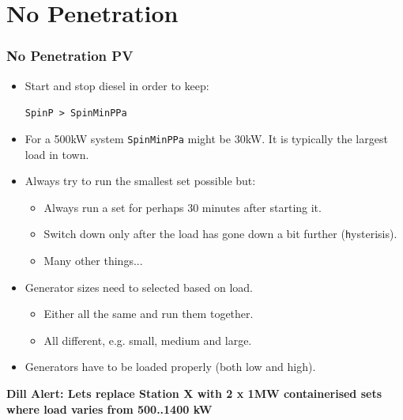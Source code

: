 \documentclass[a4paper,handout]{beamer}
\def\dill#1{\textcolor{RawSienna}{\textbf{Dill Alert: #1}}}
\begin{document}
\section{No Penetration}
\begin{frame}\frametitle{No Penetration PV}
  \begin{itemize}
  \item Start and stop diesel in order to keep:
    
    \texttt{SpinP > SpinMinPPa}
  \item For a 500kW system \texttt{SpinMinPPa} might
    be 30kW. It is typically the largest load in town.  \pause
  \item Always try to run the smallest set possible but:
    \begin{itemize}
    \item Always run a set for perhaps 30 minutes after starting it.
    \item Switch down only after the load has gone down a bit further
      (\texttt hysterisis).
    \item Many other things...
    \end{itemize}
    \pause
  \item Generator sizes need to selected based on load.
    \begin{itemize}
    \item Either all the same and run them together.
    \item All different, e.g. small, medium and large.
    \end{itemize}
    \pause
  \item Generators have to be loaded properly (both low and high).
  \end{itemize}
  \pause
  \dill{Lets replace Station X with 2 x 1MW containerised sets where 
  load varies from 500..1400 kW}
\end{frame}
\end{document}
